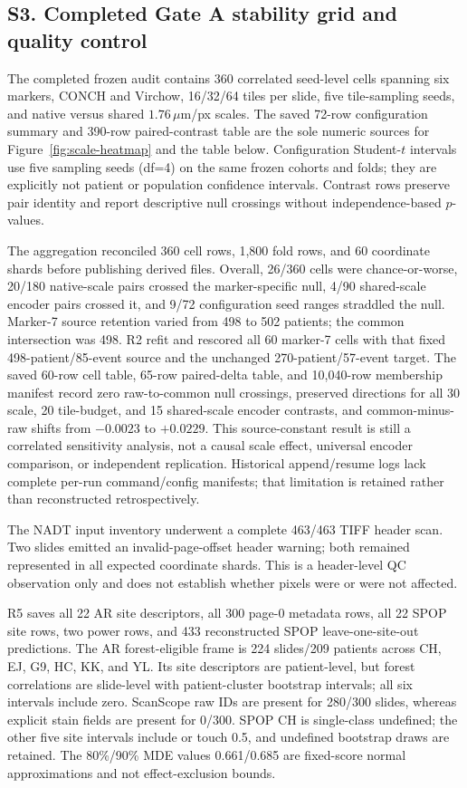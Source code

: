 \subsection*{S3. Completed Gate A stability grid and quality control}

The completed frozen audit contains 360 correlated seed-level cells spanning six markers,
CONCH and Virchow, 16/32/64 tiles per slide, five tile-sampling seeds, and native versus shared
$1.76\,\mu$m/px scales. The saved 72-row configuration summary and 390-row paired-contrast
table are the sole numeric sources for Figure~\ref{fig:scale-heatmap} and the table below.
Configuration Student-$t$ intervals use five sampling seeds (df=4) on the same frozen cohorts
and folds; they are explicitly not patient or population confidence intervals. Contrast rows
preserve pair identity and report descriptive null crossings without independence-based
$p$-values.



The aggregation reconciled 360 cell rows, 1{,}800 fold rows, and 60 coordinate shards before
publishing derived files. Overall, 26/360 cells were chance-or-worse, 20/180 native-scale pairs
crossed the marker-specific null, 4/90 shared-scale encoder pairs crossed it, and 9/72
configuration seed ranges straddled the null. Marker-7 source retention varied from 498 to 502
patients; the common intersection was 498. R2 refit and rescored all 60 marker-7 cells with
that fixed 498-patient/85-event source and the unchanged 270-patient/57-event target. The
saved 60-row cell table, 65-row paired-delta table, and 10{,}040-row membership manifest record
zero raw-to-common null crossings, preserved directions for all 30 scale, 20 tile-budget, and
15 shared-scale encoder contrasts, and common-minus-raw shifts from $-0.0023$ to $+0.0229$.
This source-constant result is still a correlated sensitivity analysis, not a causal scale
effect, universal encoder comparison, or independent replication. Historical append/resume
logs lack complete per-run command/config manifests; that limitation is retained rather than
reconstructed retrospectively.

The NADT input inventory underwent a complete 463/463 TIFF header scan. Two slides emitted an
invalid-page-offset header warning; both remained represented in all expected coordinate
shards. This is a header-level QC observation only and does not establish whether pixels were
or were not affected.

R5 saves all 22 AR site descriptors, all 300 page-0 metadata rows, all 22 SPOP site rows, two
power rows, and 433 reconstructed SPOP leave-one-site-out predictions. The AR forest-eligible
frame is 224 slides/209 patients across CH, EJ, G9, HC, KK, and YL. Its site descriptors are
patient-level, but forest correlations are slide-level with patient-cluster bootstrap
intervals; all six intervals include zero. ScanScope raw IDs are present for 280/300 slides,
whereas explicit stain fields are present for 0/300. SPOP CH is single-class undefined; the
other five site intervals include or touch 0.5, and undefined bootstrap draws are retained.
The 80\%/90\% MDE values 0.661/0.685 are fixed-score normal approximations and not
effect-exclusion bounds.

